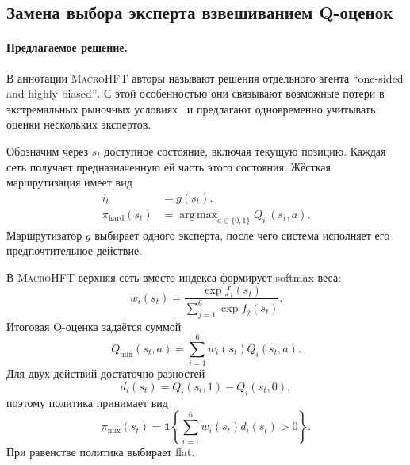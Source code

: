 \documentclass[9pt,a4paper,twocolumn]{extarticle}
\newcommand{\Macro}{\textsc{MacroHFT}}
\DeclareMathOperator*{\argmax}{arg\,max}
\begin{document}
\subsection{Замена выбора эксперта взвешиванием Q-оценок}
\label{sec:q_aggregation}

\paragraph{Предлагаемое решение.}

В аннотации \Macro{} авторы называют решения отдельного агента \foreignlanguage{english}{
\enquote{one-sided and highly biased}}. С этой особенностью они связывают возможные потери в
экстремальных рыночных условиях~\cite{zong2024macrohft} и предлагают одновременно учитывать
оценки нескольких экспертов.

Обозначим через $s_t$ доступное состояние, включая текущую позицию. Каждая сеть получает
предназначенную ей часть этого состояния. Жёсткая маршрутизация имеет вид
\begin{equation}
\begin{aligned}
  i_t &= g(s_t),\\
  \pi_{\mathrm{hard}}(s_t)
      &=\argmax_{a\in\{0,1\}}
        Q_{i_t}(s_t,a).
\end{aligned}
\label{eq:hard_routing}
\end{equation}
Маршрутизатор $g$ выбирает одного эксперта, после чего система исполняет его предпочтительное
действие.

В \Macro{} верхняя сеть вместо индекса формирует softmax-веса:
\begin{equation}
  w_i(s_t)=
  \frac{\exp f_i(s_t)}
       {\sum_{j=1}^{6}\exp f_j(s_t)}.
  \label{eq:mixing_weights}
\end{equation}
Итоговая Q-оценка задаётся суммой
\begin{equation}
  Q_{\mathrm{mix}}(s_t,a)
  =
  \sum_{i=1}^{6}
  w_i(s_t)Q_i(s_t,a).
  \label{eq:mixed_q}
\end{equation}
Для двух действий достаточно разностей
\begin{equation}
  d_i(s_t)
  =
  Q_i(s_t,1)-Q_i(s_t,0),
  \label{eq:action_advantages}
\end{equation}
поэтому политика принимает вид
\begin{equation}
  \pi_{\mathrm{mix}}(s_t)
  =
  \mathbf 1\left\{
    \sum_{i=1}^{6}
    w_i(s_t)d_i(s_t)>0
  \right\}.
  \label{eq:mixed_policy}
\end{equation}
При равенстве политика выбирает flat.
\end{document}
